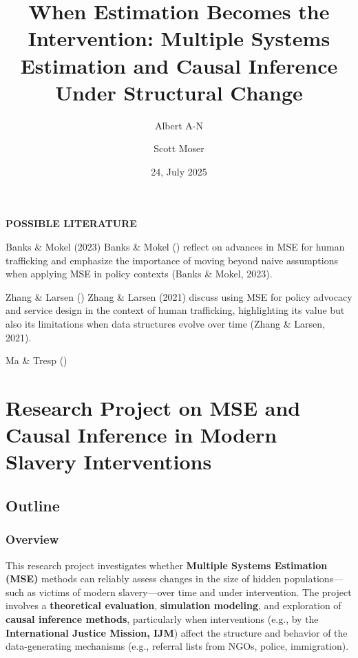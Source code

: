 \documentclass[
  12pt,
]{article}
\title{When Estimation Becomes the Intervention: Multiple Systems
Estimation and Causal Inference Under Structural Change}
\author{Albert A-N \and Scott Moser}
\date{24, July 2025}
\theoremstyle{plain}
\theoremstyle{definition}
\renewcommand*\contentsname{Table of contents}
\newcommand\contentsname{Table of contents}
\begin{document}
\maketitle

\renewcommand*\contentsname{Table of contents}
{
\hypersetup{linkcolor=}
\setcounter{tocdepth}{3}
\tableofcontents
}

\newpage

\textbf{POSSIBLE LITERATURE}

Banks \& Mokel (2023) Banks \& Mokel
() reflect on advances in MSE for
human trafficking and emphasize the importance of moving beyond naive
assumptions when applying MSE in policy contexts (Banks \& Mokel, 2023).

Zhang \& Larsen () Zhang \& Larsen
(2021) discuss using MSE for policy advocacy and service design in the
context of human trafficking, highlighting its value but also its
limitations when data structures evolve over time (Zhang \& Larsen,
2021).

Ma \& Tresp ()

\section{\texorpdfstring{\textbf{Research Project on MSE and Causal
Inference in Modern Slavery
Interventions}}{Research Project on MSE and Causal Inference in Modern Slavery Interventions}}\label{research-project-on-mse-and-causal-inference-in-modern-slavery-interventions}

\subsection{Outline}\label{outline}

\subsubsection{\texorpdfstring{\textbf{Overview}}{Overview}}\label{overview}

This research project investigates whether \textbf{Multiple Systems
Estimation (MSE)} methods can reliably assess changes in the size of
hidden populations---such as victims of modern slavery---over time and
under intervention. The project involves a \textbf{theoretical
evaluation}, \textbf{simulation modeling}, and exploration of
\textbf{causal inference methods}, particularly when interventions
(e.g., by the \textbf{International Justice Mission, IJM}) affect the
structure and behavior of the data-generating mechanisms (e.g., referral
lists from NGOs, police, immigration).
\end{document}
